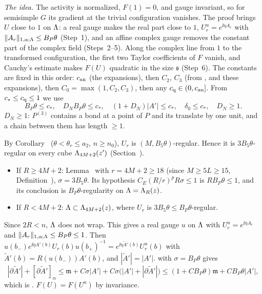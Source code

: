 \begin{detail}\label{d8:qb}
\emph{The idea.} The activity is normalized, $F(1)=0$, and gauge invariant, so for semisimple $G$ its gradient at the trivial configuration vanishes. The proof brings $U$ close to $1$ on $\Lambda$: a real gauge makes the real part close to $1$, $U_r^u=e^{\ii\eta A_r}$ with $\|A_r\|_{1,\alpha;\Lambda}\le B_P\theta$ (Step~1), and an affine complex gauge removes the constant part of the complex field (Steps~2--5). Along the complex line from $1$ to the transformed configuration, the first two Taylor coefficients of $F$ vanish, and Cauchy's estimate makes $F(U)$ quadratic in the size $\mathfrak s$ (Step~6).
The constants are fixed in this order: $c_{\rm an}$ (the expansions), then $C_2$, $C_3$ (from ,  and these expansions), then $C_0=\max(1,C_2,C_3)$, then any $c_{\rm q}\in(0,c_{\rm an}]$. From $c_*\le c_{\rm q}\le1$ we use
\[
B_P\theta\le c_*,\quad D_NB_P\theta\le c_*,\quad(1+D_N)|A'|\le c_*,\quad\delta_0\le c_*,\quad D_N\ge1 .
\]
$D_N\ge1$: $P^{(3)}$ contains a bond at a point of $P$ and its translate by one unit, and a chain between them has length $\ge1$.

\begin{step}
By Corollary~ ($\theta<\theta_r\le a_2$, $n\ge n_0$), $U_r$ is $(M,B_5\theta)$-regular. Hence it is $3B_5\theta$-regular on every cube $\Lambda_{4M+2}(z')$ (Section~).
\begin{itemize}
\item If $R\ge4M+2$: Lemma~ with $r=4M+2\ge18$ (since $M\ge5L\ge15$, Definition~), $\sigma=3B_5\theta$. Its hypothesis $C_E(R/r)^pR\sigma\le1$ is $RB_P\theta\le1$, and its conclusion is $B_P\theta$-regularity on $\Lambda=\Lambda_R(z)$.
\item If $R<4M+2$: $\Lambda\subset\Lambda_{4M+2}(z)$, where $U_r$ is $3B_5\theta\le B_P\theta$-regular.
\end{itemize}
Since $2R<n$, $\Lambda$ does not wrap. This gives a real gauge $u$ on $\Lambda$ with $U_r^u=e^{\ii\eta A_r}$ and $\|A_r\|_{1,\alpha;\Lambda}\le B_P\theta\le1$. Then $u(b_-)e^{\ii\eta A'(b)}U_r(b)u(b_+)^{-1}=e^{\ii\eta\tilde A'(b)}U_r^u(b)$ with $\tilde A'(b)=R(u(b_-))A'(b)$, and $|\tilde A'|=|A'|$.  with $\sigma=B_P\theta$ gives
\[
|\partial\tilde A'|+[\partial\tilde A']_\alpha\le\mathfrak m+C\sigma|A'|+C\sigma\big(|A'|+|\partial\tilde A'|\big)\le(1+CB_P\theta)\mathfrak m+CB_P\theta|A'| ,
\]
which is . $F(U)=F(U^u)$ by invariance.
\end{step}


\end{detail}
